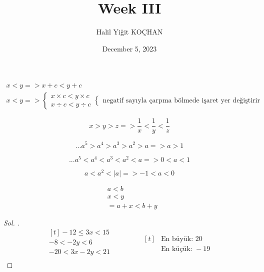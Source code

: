 \documentclass{article}
\title{Week III}
\author{Halil Yiğit KOÇHAN}
\date{December 5, 2023}
\theoremstyle{mytheoremstyle}
\theoremstyle{mytheoremstyle}
\theoremstyle{myproblemstyle}
\begin{document}
    \maketitle

\begin{gather*}
  x < y => x + c < y + c\\
  x < y =>
  \begin{cases}
    x \times c < y \times c\\
    x \div c < y \div c
  \end{cases}
  \begin{cases}
    \text{negatif sayıyla çarpma bölmede işaret yer değiştirir}
  \end{cases}
\end{gather*}

$$ x > y > z => \frac{1}{x} < \frac{1}{y} < \frac{1}{z} $$

$$ ... a^5 > a^4 > a^3 > a^2 > a => a > 1 $$

$$ ... a^5 < a^4 < a^3 < a^2 < a => 0 < a < 1 $$

$$ a < a^2 < |a| => -1 < a < 0 $$

\begin{align*}
  &a < b\\
  &x < y\\
  &= a + x < b + y
\end{align*}

\begin{problem}
\end{problem}

\begin{proof}[\textit{ Sol. }]
  \begin{equation*}
    \begin{aligned}[t]
      -12 \le 3x < 15\\
      -8 < -2y < 6\\
      -20 < 3x -2y < 21\\
    \end{aligned}
    \qquad\qquad
    \begin{aligned}[t]
      &\text{En büyük: } 20\\
      &\text{En küçük: } -19
    \end{aligned}
  \end{equation*}
\end{proof}

\begin{problem}
\end{problem}
\end{document}

